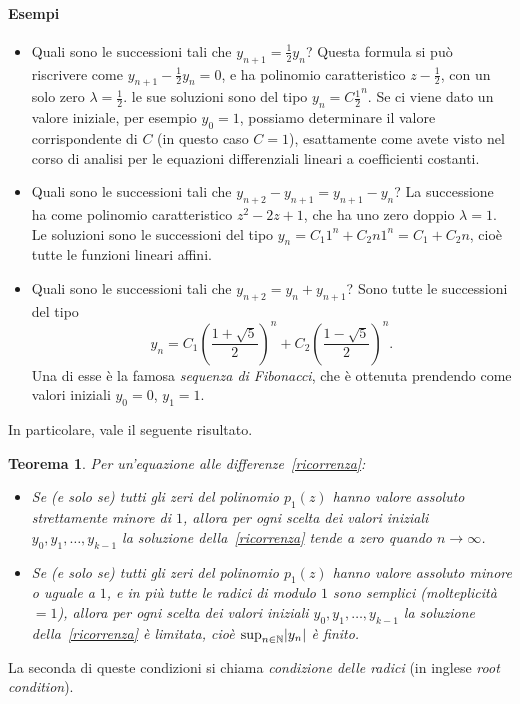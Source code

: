 \documentclass[a4paper]{report}
\DeclarePairedDelimiter{\abs}{\lvert}{\rvert}
\newtheorem{theorem}{Teorema}[chapter]
\theoremstyle{definiton}
\theoremstyle{remark}
\begin{document}
\paragraph{Esempi}
\begin{itemize}
    \item Quali sono le successioni tali che $y_{n+1} = \frac{1}{2}y_n$? Questa formula si può riscrivere come $y_{n+1}-\frac{1}{2}y_n=0$, e ha polinomio caratteristico $z-\frac{1}{2}$, con un solo zero $\lambda=\frac{1}{2}$. le sue soluzioni sono del tipo $y_n = C \frac{1}{2}^n$. Se ci viene dato un valore iniziale, per esempio $y_0=1$, possiamo determinare il valore corrispondente di $C$ (in questo caso $C=1$), esattamente come avete visto nel corso di analisi per le equazioni differenziali lineari a coefficienti costanti.
    \item Quali sono le successioni tali che $y_{n+2} - y_{n+1} = y_{n+1}-y_n$? La successione ha come polinomio caratteristico $z^2-2z+1$, che ha uno zero doppio $\lambda=1$. Le soluzioni sono le successioni del tipo $y_n = C_1 1^n + C_2 n 1^n = C_1 + C_2 n$, cioè tutte le funzioni lineari affini.
    \item Quali sono le successioni tali che $y_{n+2} = y_n + y_{n+1}$? Sono tutte le successioni del tipo
    \[
        y_n = C_1 \left(\frac{1+\sqrt{5}}{2}\right)^n + C_2 \left(\frac{1-\sqrt{5}}{2}\right)^n.
    \]
    Una di esse è la famosa \emph{sequenza di Fibonacci}, che è ottenuta prendendo come valori iniziali $y_0 = 0$, $y_1=1$.
\end{itemize}
In particolare, vale il seguente risultato.
\begin{theorem} \label{thm:eq-differenze} Per un'equazione alle differenze~\eqref{ricorrenza}:
\begin{itemize}
    \item Se (e solo se) tutti gli zeri del polinomio $p_1(z)$ hanno valore assoluto strettamente minore di $1$, allora per ogni scelta dei valori iniziali $y_0, y_1,\dots, y_{k-1}$ la soluzione della~\eqref{ricorrenza} tende a zero quando $n\to\infty$.
    \item Se (e solo se) tutti gli zeri del polinomio $p_1(z)$ hanno valore assoluto minore o uguale a $1$, e in più tutte le radici di modulo $1$ sono semplici (molteplicità $=1$), allora per ogni scelta dei valori iniziali $y_0, y_1,\dots, y_{k-1}$ la soluzione della~\eqref{ricorrenza} è limitata, cioè $\sup_{n\in\mathbb{N}} \abs{y_n}$ è finito.
\end{itemize}
\end{theorem}
La seconda di queste condizioni si chiama \emph{condizione delle radici} (in inglese \emph{root condition}).
\end{document}
